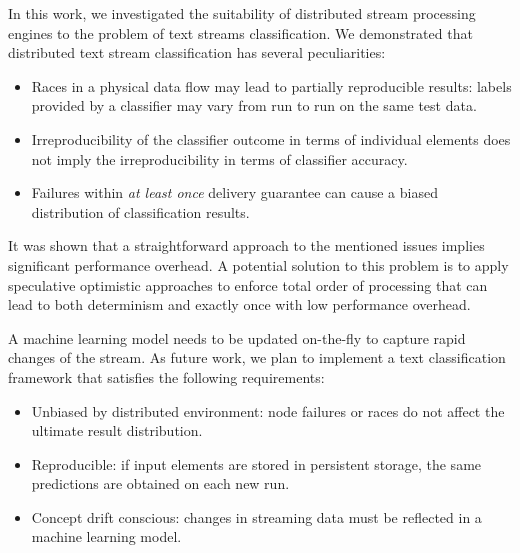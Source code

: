 \label {fs-conclusion}

In this work, we investigated the suitability of distributed stream processing engines to the problem of text streams classification. We demonstrated that distributed text stream classification has several peculiarities:

\begin{itemize}
    \item Races in a physical data flow may lead to partially reproducible results: labels provided by a classifier may vary from run to run on the same test data.
    \item Irreproducibility of the classifier outcome in terms of individual elements does not imply the irreproducibility in terms of classifier accuracy. 
    \item Failures within {\em at least once} delivery guarantee can cause a biased distribution of classification results.
\end{itemize}

It was shown that a straightforward approach to the mentioned issues implies significant performance overhead. A potential solution to this problem is to apply speculative optimistic approaches to enforce total order of processing that can lead to both determinism and exactly once with low performance overhead. 

A machine learning model needs to be updated on-the-fly to capture rapid changes of the stream. As future work, we plan to implement a text classification framework that satisfies the following requirements:

\begin{itemize}
    \item Unbiased by distributed environment: node failures or races do not affect the ultimate result distribution.
    \item Reproducible: if input elements are stored in persistent storage, the same predictions are obtained on each new run.
    \item Concept drift conscious: changes in streaming data must be reflected in a machine learning model.  
\end{itemize}